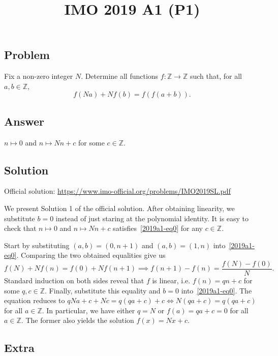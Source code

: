 \documentclass{article}
\title{IMO 2019 A1 (P1)}
\author{}
\date{}
\newcommand{\Z}{\mathbb{Z}}
\begin{document}
\maketitle



\subsection*{Problem}

Fix a non-zero integer $N$.
Determine all functions $f : \Z \to \Z$ such that, for all $a, b \in \Z$,
\[ f(Na) + N f(b) = f(f(a + b)). \tag{*}\label{2019a1-eq0} \]



\subsection*{Answer}

$n \mapsto 0$ and $n \mapsto Nn + c$ for some $c \in \Z$.



\subsection*{Solution}

Official solution: \url{https://www.imo-official.org/problems/IMO2019SL.pdf}

We present Solution 1 of the official solution.
After obtaining linearity, we substitute $b = 0$ instead of just staring at the polynomial identity.
It is easy to check that $n \mapsto 0$ and $n \mapsto Nn + c$ satisfies~\eqref{2019a1-eq0} for any $c \in \Z$.

Start by substituting $(a, b) = (0, n + 1)$ and $(a, b) = (1, n)$ into~\eqref{2019a1-eq0}.
Comparing the two obtained equalities give us
\[ f(N) + N f(n) = f(0) + N f(n + 1) \implies f(n + 1) - f(n) = \frac{f(N) - f(0)}{N}. \]
Standard induction on both sides reveal that $f$ is linear, i.e. $f(n) = qn + c$ for some $q, c \in \Z$.
Finally, substitute this equality and $b = 0$ into~\eqref{2019a1-eq0}.
The equation reduces to $qNa + c + Nc = q(qa + c) + c \iff N(qa + c) = q(qa + c)$ for all $a \in \Z$.
In particular, we have either $q = N$ or $f(a) = qa + c = 0$ for all $a \in \Z$.
The former also yields the solution $f(x) = Nx + c$.



\subsection*{Extra}
\end{document}
